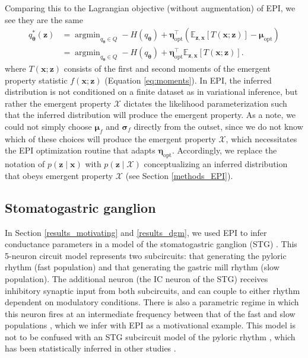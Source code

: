 \documentclass[11pt]{article}
\DeclareMathOperator*{\argmin}{argmin}
\begin{document}
Comparing this to the Lagrangian objective (without augmentation) of EPI, we see they are the same
\begin{equation}
\begin{split}
q_{\bm{\theta}}^*(\mathbf{z}) &= \argmin_{q_{\bm{\theta}} \in Q} - H(q_{\bm{\theta}}) + \bm{\eta}_{\text{opt}}^\top \left(\mathbb{E}_{\mathbf{z}, \mathbf{x}} \left[T(\mathbf{x}; \mathbf{z}) \right] - \bm{\mu}_{\text{opt}} \right) \\
 &= \argmin_{q_{\bm{\theta}} \in Q} - H(q_{\bm{\theta}}) + \bm{\eta}_{\text{opt}}^\top \mathbb{E}_{\mathbf{z}, \mathbf{x}} \left[T(\mathbf{x}; \mathbf{z}) \right].
\end{split}
\end{equation}
where $T(\mathbf{x}; \mathbf{z})$ consists of the first and second moments of the emergent property statistic $f(\mathbf{x}; \mathbf{z})$ (Equation \ref{eq:moments}).
In EPI, the inferred distribution is not conditioned on a finite dataset as in variational inference, but rather the emergent property $\mathcal{X}$ dictates the likelihood parameterization such that the inferred distribution will produce the emergent property.
As a note, we could not simply choose $\bm{\mu}_f$ and $\bm{\sigma}_f$ directly from the outset, since we do not know which of these choices will produce the emergent property $\mathcal{X}$, which necessitates the EPI optimization routine that adapts $\bm{\eta}_{\text{opt}}$.
Accordingly, we replace the notation of $p(\mathbf{z} \mid \mathbf{x})$ with $p(\mathbf{z} \mid \mathcal{X})$ conceptualizing an inferred distribution that obeys emergent property $\mathcal{X}$ (see Section \ref{methods_EPI}). 

\subsection{Stomatogastric ganglion}\label{methods_STG}
In Section \ref{results_motivating} and \ref{results_dgm}, we used EPI to infer conductance parameters in a model of the stomatogastric ganglion (STG) \cite{gutierrez2013multiple}.
This 5-neuron circuit model represents two subcircuits: that generating the pyloric rhythm (fast population) and that generating the gastric mill rhythm (slow population).
The additional neuron (the IC neuron of the STG) receives inhibitory synaptic input from both subcircuits, and can couple to either rhythm dependent on  modulatory conditions.
There is also a parametric regime in which this neuron fires at an intermediate frequency between that of the fast and slow populations \cite{gutierrez2013multiple}, which we infer with EPI as a motivational example.
This model is not to be confused with an STG subcircuit model of the pyloric rhythm \cite{marder1992dynamic}, which has been statistically inferred in other studies \cite{prinz2004similar, gonccalves2019training}.
\end{document}

